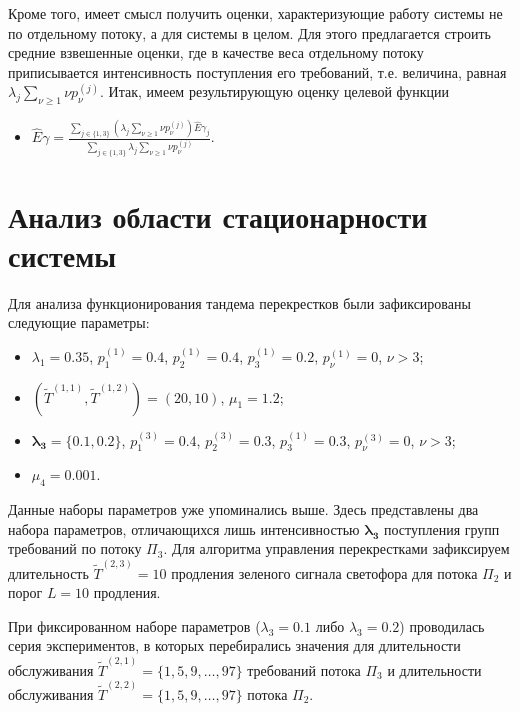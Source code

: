 %
Кроме того, имеет смысл получить оценки, характеризующие работу системы не по отдельному потоку, а для системы в целом. Для этого предлагается строить средние взвешенные оценки, где в качестве веса отдельному потоку приписывается интенсивность поступления его требований, т.е. величина, равная $\lambda_j \sum_{\nu\geqslant1}\nu p_{\nu}^{(j)}$. Итак, имеем результирующую оценку целевой функции
\begin{itemize}
    \item $\hat{E}\gamma=\frac{\sum_{j\in\{1,3\}} (\lambda_j \sum_{\nu\geqslant1}\nu p_{\nu}^{(j)})\hat{E}\gamma_{j} }{\sum_{j\in\{1,3\}} \lambda_j \sum_{\nu\geqslant1}\nu p_{\nu}^{(j)}}$.
\end{itemize}


\section{Анализ области стационарности системы}
Для анализа функционирования тандема перекрестков были зафиксированы следующие параметры:
\begin{itemize}
    \item $\lambda_1=0.35$, $p_{1}^{(1)}=0.4$, $p_{2}^{(1)}=0.4$, $p_{3}^{(1)}=0.2$, $p_{\nu}^{(1)}=0$, $\nu > 3$;
    \item $(\widetilde{T}^{(1,1)}, \widetilde{T}^{(1,2)})=(20,10)$, $\mu_1 = 1.2$;
    \item $\boldsymbol{ \lambda_3=\{0.1, 0.2\}}$, $p_{1}^{(3)}=0.4$, $p_{2}^{(3)}=0.3$, $p_{3}^{(1)}=0.3$, $p_{\nu}^{(3)}=0$, $\nu > 3$;
        \item $\mu_4= 0.001$.
\end{itemize}
Данные наборы параметров уже упоминались выше. Здесь представлены два набора параметров, отличающихся лишь интенсивностью $\boldsymbol{\lambda_3}$ поступления групп требований по потоку $\Pi_3$. Для алгоритма управления перекрестками зафиксируем длительность $\widetilde{T}^{(2,3)}=10$ продления зеленого сигнала светофора для потока $\Pi_2$ и порог $L=10$ продления.

При фиксированном наборе параметров ($\lambda_3 = 0.1$ либо $\lambda_3=0.2$) проводилась серия экспериментов, в которых перебирались значения для длительности обслуживания  $\widetilde{T}^{(2,1)} = \{1, 5, 9, \ldots, 97\}$ требований потока $\Pi_3$ и длительности обслуживания $\widetilde{T}^{(2,2)} = \{1, 5, 9, \ldots, 97\}$ потока $\Pi_2$.

